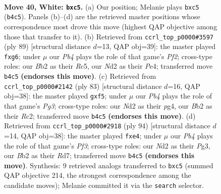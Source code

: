 \documentclass[11pt]{article}
\begin{document}
\clearpage

\begin{figure}[p]\centering
\begin{subfigure}{0.46\textwidth}\centering
\resizebox{\linewidth}{!}{%
\newchessgame
\chessboard[
  setfen={5k2/8/8/2p3rp/1P6/7K/1B1N4/8 w - - 0 40},
  showmover=false,
  pgfstyle=straightmove, color=movearrow, markmove={b4-c5}
]}
\caption{}
\end{subfigure}\hfill
\begin{subfigure}{0.46\textwidth}\centering
\resizebox{\linewidth}{!}{%
\newchessgame
\chessboard[
  setfen={6k1/5p2/5PPR/2r5/4p3/1K6/8/8 b - - 0 45},
  showmover=false,
  pgfstyle=straightmove, color=movearrow, markmove={f7-g6}
]}
\caption{}
\end{subfigure}
\\[4pt]
\begin{subfigure}{0.46\textwidth}\centering
\resizebox{\linewidth}{!}{%
\newchessgame
\chessboard[
  setfen={8/6k1/6p1/3R1P2/6P1/5K2/2r5/8 b - - 2 42},
  showmover=false,
  pgfstyle=straightmove, color=movearrow, markmove={g6-f5}
]}
\caption{}
\end{subfigure}\hfill
\begin{subfigure}{0.46\textwidth}\centering
\resizebox{\linewidth}{!}{%
\newchessgame
\chessboard[
  setfen={5k2/3R4/p7/8/4p3/5PP1/r7/6K1 w - - 0 48},
  showmover=false,
  pgfstyle=straightmove, color=movearrow, markmove={f3-e4}
]}
\caption{}
\end{subfigure}
\caption{\textbf{Move 40, White: \texttt{bxc5}.} (a) Our position; Melanie plays \texttt{bxc5} (\texttt{b4c5}). Panels (b)--(d) are the retrieved master positions whose correspondence most drove this move (highest QAP objective among those that transfer to it). (b) Retrieved from \texttt{ccrl\_top\_p0000\#3597} (ply 89) [structural distance $d$=13, QAP obj=39]: the master played \texttt{fxg6}; under $\mu$ our \emph{Pb4} plays the role of that game's \emph{Pf2}; cross-type roles: our \emph{B}b2 as their \emph{R}c5, our \emph{N}d2 as their \emph{P}e4; transferred move \texttt{b4c5} \textbf{(endorses this move)}. (c) Retrieved from \texttt{ccrl\_top\_p0000\#2142} (ply 83) [structural distance $d$=16, QAP obj=38]: the master played \texttt{gxf5}; under $\mu$ our \emph{Pb4} plays the role of that game's \emph{Pg3}; cross-type roles: our \emph{N}d2 as their \emph{p}g4, our \emph{B}b2 as their \emph{R}c2; transferred move \texttt{b4c5} \textbf{(endorses this move)}. (d) Retrieved from \texttt{ccrl\_top\_p0000\#2918} (ply 94) [structural distance $d$=14, QAP obj=38]: the master played \texttt{fxe4}; under $\mu$ our \emph{Pb4} plays the role of that game's \emph{Pf3}; cross-type roles: our \emph{N}d2 as their \emph{P}g3, our \emph{B}b2 as their \emph{R}d7; transferred move \texttt{b4c5} \textbf{(endorses this move)}. Synthesis: 9 retrieved analogs transferred to \texttt{bxc5} (summed QAP objective 214, the strongest correspondence among the candidate moves); Melanie committed it via the \texttt{search} selector.}
\label{fig:thought-m78}
\end{figure}
\end{document}
